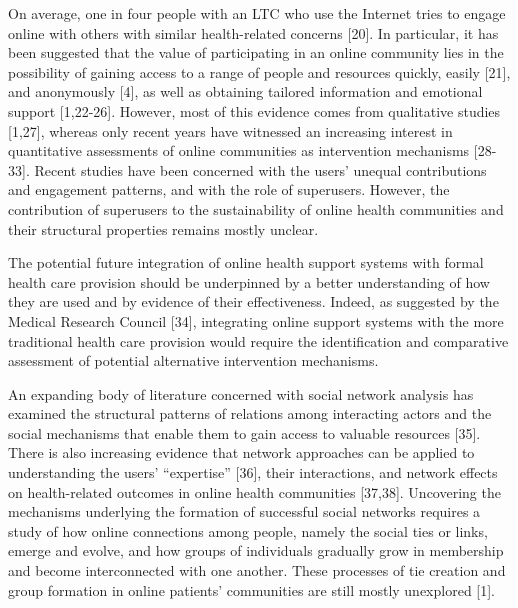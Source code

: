 On average, one in four people with an LTC who use the Internet tries to engage online with others with similar health-related concerns [20]. In particular, it has been suggested that the value of participating in an online community lies in the possibility of gaining access to a range of people and resources quickly, easily [21], and anonymously [4], as well as obtaining tailored information and emotional support [1,22-26]. However, most of this evidence comes from qualitative studies [1,27], whereas only recent years have witnessed an increasing interest in quantitative assessments of online communities as intervention mechanisms [28-33]. Recent studies have been concerned with the users’ unequal contributions and engagement patterns, and with the role of superusers. However, the contribution of superusers to the sustainability of online health communities and their structural properties remains mostly unclear.

The potential future integration of online health support systems with formal health care provision should be underpinned by a better understanding of how they are used and by evidence of their effectiveness. Indeed, as suggested by the Medical Research Council [34], integrating online support systems with the more traditional health care provision would require the identification and comparative assessment of potential alternative intervention mechanisms.

An expanding body of literature concerned with social network analysis has examined the structural patterns of relations among interacting actors and the social mechanisms that enable them to gain access to valuable resources [35]. There is also increasing evidence that network approaches can be applied to understanding the users’ “expertise” [36], their interactions, and network effects on health-related outcomes in online health communities [37,38]. Uncovering the mechanisms underlying the formation of successful social networks requires a study of how online connections among people, namely the social ties or links, emerge and evolve, and how groups of individuals gradually grow in membership and become interconnected with one another. These processes of tie creation and group formation in online patients’ communities are still mostly unexplored [1].

